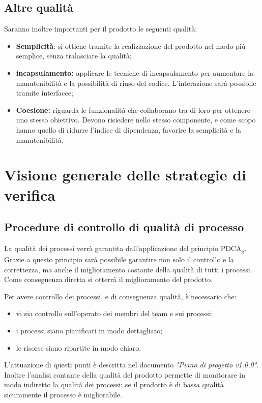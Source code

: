 \documentclass[12pt,a4paper,titlepage]{article}
\begin{document}
		\subsection{Altre qualità}
		Saranno inoltre importanti per il prodotto le seguenti qualità:
		\begin{itemize}
			\item \textbf{Semplicità}: si ottiene tramite la realizzazione del prodotto nel modo più semplice, senza 
			tralasciare la qualità;
			\item \textbf{incapsulamento:} applicare le tecniche di incapsulamento per aumentare la manutenibilità e la possibilità di riuso del codice. L'interazione sarà possibile tramite interfacce;
			\item \textbf{Coesione:} riguarda le funzionalità che collaborano tra di loro per ottenere uno stesso obiettivo. Devono risiedere nello stesso componente, e come scopo hanno quello di ridurre l'indice di dipendenza, favorire la semplicità e la manutenibilità.
		\end{itemize}
	\section{Visione generale delle strategie di verifica}
	\subsection{Procedure di controllo di qualità di processo}
	La qualità dei processi verrà garantita dall'applicazione del principio PDCA\textsubscript{g}. Grazie a questo principio sarà possibile garantire non solo il controllo e la correttezza, ma anche il miglioramento costante della qualità di tutti i processi. Come conseguenza diretta si otterrà il miglioramento del prodotto.
	
	Per avere controllo dei processi, e di conseguenza qualità, è necessario che:
	\begin{itemize}
		\item vi sia controllo sull'operato dei membri del team e sui processi;
		\item i processi siano pianificati in modo dettagliato;
		\item le risorse siano ripartite in modo chiaro.
	\end{itemize}
	L'attuazione di questi punti è descritta nel documento \textit{"Piano di progetto v1.0.0"}. Inoltre l'analisi contante della qualità del prodotto permette di monitorare in modo indiretto la qualità dei processi: se il prodotto è di bassa qualità sicuramente il processo è migliorabile.
	
\end{document}

